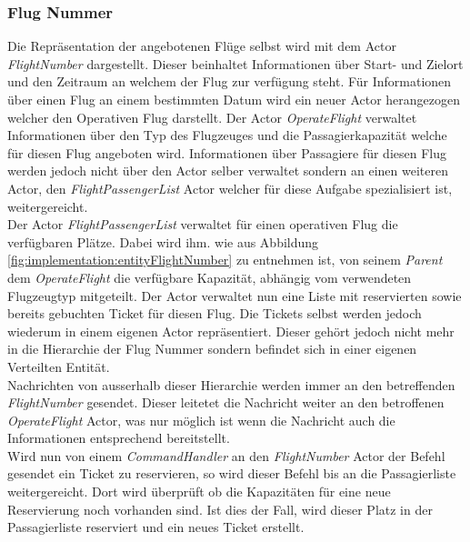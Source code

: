 \subsubsection{Flug Nummer}
Die Repräsentation der angebotenen Flüge selbst wird mit dem Actor \textit{FlightNumber} dargestellt. Dieser beinhaltet Informationen über Start- und Zielort und den Zeitraum an welchem der Flug zur verfügung steht. Für Informationen über einen Flug an einem bestimmten Datum wird ein neuer Actor herangezogen welcher den Operativen Flug darstellt. Der Actor \textit{OperateFlight} verwaltet Informationen über den Typ des Flugzeuges und die Passagierkapazität welche für diesen Flug angeboten wird. Informationen über Passagiere für diesen Flug werden jedoch nicht über den Actor selber verwaltet sondern an einen weiteren Actor, den \textit{FlightPassengerList} Actor welcher für diese Aufgabe spezialisiert ist, weitergereicht. \\
Der Actor \textit{FlightPassengerList} verwaltet für einen operativen Flug die verfügbaren Plätze. Dabei wird ihm. wie aus Abbildung \ref{fig:implementation:entityFlightNumber} zu entnehmen ist, von seinem \textit{Parent} dem \textit{OperateFlight} die verfügbare Kapazität, abhängig vom verwendeten Flugzeugtyp mitgeteilt. Der Actor verwaltet nun eine Liste mit reservierten sowie bereits gebuchten Ticket für diesen Flug. Die Tickets selbst werden jedoch wiederum in einem eigenen Actor repräsentiert. Dieser gehört jedoch nicht mehr in die Hierarchie der Flug Nummer sondern befindet sich in einer eigenen Verteilten Entität. \\
Nachrichten von ausserhalb dieser Hierarchie werden immer an den betreffenden \textit{FlightNumber} gesendet. Dieser leitetet die Nachricht weiter an den betroffenen \textit{OperateFlight} Actor, was nur möglich ist wenn die Nachricht auch die Informationen entsprechend bereitstellt. \\
Wird nun von einem \textit{CommandHandler} an den \textit{FlightNumber} Actor der Befehl gesendet ein Ticket zu reservieren, so wird dieser Befehl bis an die Passagierliste weitergereicht. Dort wird überprüft ob die Kapazitäten für eine neue Reservierung noch vorhanden sind. Ist dies der Fall, wird dieser Platz in der Passagierliste reserviert und ein neues Ticket erstellt. 

